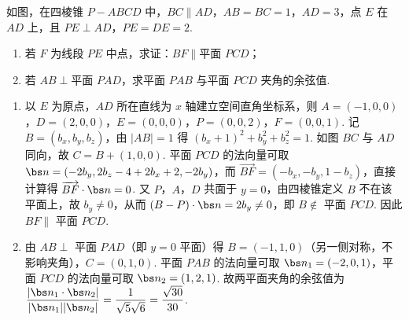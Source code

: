\begin{problem}
如图，在四棱锥 \(P-ABCD\) 中，\(BC\parallel AD\)，\(AB=BC=1\)，\(AD=3\)，点 \(E\) 在 \(AD\) 上，且 \(PE\perp AD\)，\(PE=DE=2\).

\begin{enumerate}
\item 若 \(F\) 为线段 \(PE\) 中点，求证：\(BF\parallel \text{平面 }PCD\)；
\item 若 \(AB\perp \text{平面 }PAD\)，求平面 \(PAB\) 与平面 \(PCD\) 夹角的余弦值.
\end{enumerate}

\end{problem}

\begin{solution}
\begin{enumerate}
\item 以 \(E\) 为原点，\(AD\) 所在直线为 \(x\) 轴建立空间直角坐标系，则 \(A=(-1,0,0)\)，\(D=(2,0,0)\)，\(E=(0,0,0)\)，\(P=(0,0,2)\)，\(F=(0,0,1)\). 记 \(B=(b_x,b_y,b_z)\)，由 \(|AB|=1\) 得 \((b_x+1)^2+b_y^2+b_z^2=1\). 如图 \(BC\) 与 \(AD\) 同向，故 \(C=B+(1,0,0)\). 平面 \(PCD\) 的法向量可取 \(\bs n=(-2b_y,2b_z-4+2b_x+2,-2b_y)\)，而 \(\overrightarrow{BF}=(-b_x,-b_y,1-b_z)\)，直接计算得 \(\overrightarrow{BF}\cdot\bs n=0\). 又 \(P\)，\(A\)，\(D\) 共面于 \(y=0\)，由四棱锥定义 \(B\) 不在该平面上，故 \(b_y\ne0\)，从而 \((B-P)\cdot\bs n=2b_y\ne0\)，即 \(B\notin\) 平面 \(PCD\). 因此 \(BF\parallel\) 平面 \(PCD\).
\item 由 \(AB\perp\) 平面 \(PAD\)（即 \(y=0\) 平面）得 \(B=(-1,1,0)\)（另一侧对称，不影响夹角），\(C=(0,1,0)\). 平面 \(PAB\) 的法向量可取 \(\bs n_1=(-2,0,1)\)，平面 \(PCD\) 的法向量可取 \(\bs n_2=(1,2,1)\). 故两平面夹角的余弦值为 \(\dfrac{|\bs n_1\cdot\bs n_2|}{|\bs n_1||\bs n_2|}=\dfrac{1}{\sqrt5\sqrt6}=\dfrac{\sqrt{30}}{30}\).
\end{enumerate}
\end{solution}

